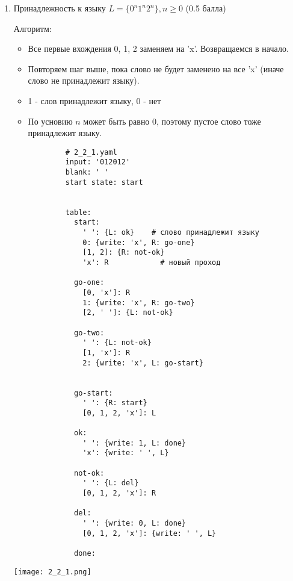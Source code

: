 \documentclass{article}
\begin{document}
\begin{enumerate}

    \item Принадлежность к языку $L = \{ 0^n1^n2^n \}, n \ge 0$ (0.5 балла)
    
        Алгоритм:
        \begin{itemize}
            \item Все первые вхождения 0, 1, 2 заменяем на 'x'. Возвращаемся в начало.
            \item Повторяем шаг выше, пока слово не будет заменено на все 'x' (иначе слово не принадлежит языку).
            \item 1 - слов принадлежит языку, 0 - нет
            \item По усновию $n$ может быть равно 0, поэтому пустое слово тоже принадлежит языку. 
        \end{itemize}
        
        \begin{verbatim}
            # 2_2_1.yaml
            input: '012012'
            blank: ' '
            start state: start
            
            
            table:
              start:
                ' ': {L: ok}    # слово принадлежит языку
                0: {write: 'x', R: go-one} 
                [1, 2]: {R: not-ok}
                'x': R            # новый проход
              
              go-one:
                [0, 'x']: R    
                1: {write: 'x', R: go-two} 
                [2, ' ']: {L: not-ok}
              
              go-two:
                ' ': {L: not-ok}
                [1, 'x']: R
                2: {write: 'x', L: go-start}
            
              
              go-start:
                ' ': {R: start}
                [0, 1, 2, 'x']: L 
                
              ok:
                ' ': {write: 1, L: done}
                'x': {write: ' ', L}
              
              not-ok:
                ' ': {L: del}
                [0, 1, 2, 'x']: R
              
              del:
                ' ': {write: 0, L: done}
                [0, 1, 2, 'x']: {write: ' ', L} 
            
              done:
        \end{verbatim}
        \begin{center}
            \texttt{[image: 2\_2\_1.png]} \\
        \end{center}
        

\end{enumerate}
\end{document}
